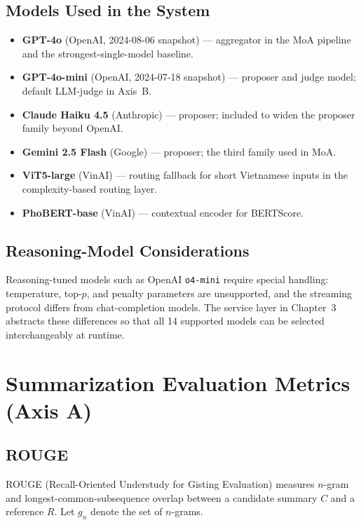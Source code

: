 \subsection{Models Used in the System}

\begin{itemize}
  \item \textbf{GPT-4o} (OpenAI, 2024-08-06 snapshot) --- aggregator in the
        MoA pipeline and the strongest-single-model baseline.
  \item \textbf{GPT-4o-mini} (OpenAI, 2024-07-18 snapshot) --- proposer
        and judge model; default LLM-judge in Axis~B.
  \item \textbf{Claude Haiku 4.5} (Anthropic) --- proposer; included to
        widen the proposer family beyond OpenAI.
  \item \textbf{Gemini 2.5 Flash} (Google) --- proposer; the third
        family used in MoA.
  \item \textbf{ViT5-large} (VinAI) --- routing fallback for short
        Vietnamese inputs in the complexity-based routing layer.
  \item \textbf{PhoBERT-base} (VinAI) --- contextual
        encoder for BERTScore.
\end{itemize}

\subsection{Reasoning-Model Considerations}

Reasoning-tuned models such as OpenAI \texttt{o4-mini} require special handling: temperature, top-$p$, and
penalty parameters are unsupported, and the streaming protocol differs from
chat-completion models. The service layer in Chapter~3 abstracts these
differences so that all 14 supported models can be selected interchangeably
at runtime.

\section{Summarization Evaluation Metrics (Axis A)}

\subsection{ROUGE}

ROUGE \cite{Lin2004} (Recall-Oriented Understudy for Gisting Evaluation)
measures $n$-gram and longest-common-subsequence overlap between a candidate
summary $C$ and a reference $R$. Let $g_n$ denote the set of $n$-grams.

